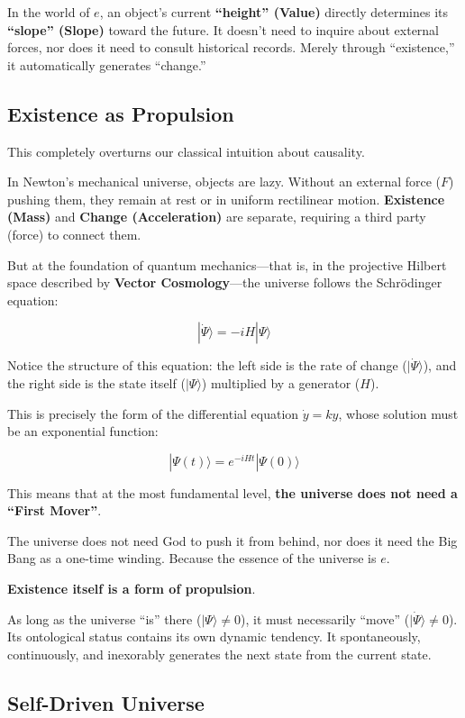 In the world of $e$, an object's current \textbf{``height'' (Value)} directly determines its \textbf{``slope'' (Slope)} toward the future. It doesn't need to inquire about external forces, nor does it need to consult historical records. Merely through ``existence,'' it automatically generates ``change.''

\subsection{Existence as Propulsion}

This completely overturns our classical intuition about causality.

In Newton's mechanical universe, objects are lazy. Without an external force ($F$) pushing them, they remain at rest or in uniform rectilinear motion. \textbf{Existence (Mass)} and \textbf{Change (Acceleration)} are separate, requiring a third party (force) to connect them.

But at the foundation of quantum mechanics---that is, in the projective Hilbert space described by \textbf{Vector Cosmology}---the universe follows the Schrödinger equation:

$$|\dot{\Psi}\rangle = -iH |\Psi\rangle$$

Notice the structure of this equation: the left side is the rate of change ($|\dot{\Psi}\rangle$), and the right side is the state itself ($|\Psi\rangle$) multiplied by a generator ($H$).

This is precisely the form of the differential equation $\dot{y} = ky$, whose solution must be an exponential function:

$$|\Psi(t)\rangle = e^{-iHt} |\Psi(0)\rangle$$

This means that at the most fundamental level, \textbf{the universe does not need a ``First Mover''}.

The universe does not need God to push it from behind, nor does it need the Big Bang as a one-time winding. Because the essence of the universe is \textbf{$e$}.

\textbf{Existence itself is a form of propulsion}.

As long as the universe ``is'' there ($|\Psi\rangle \neq 0$), it must necessarily ``move'' ($|\dot{\Psi}\rangle \neq 0$). Its ontological status contains its own dynamic tendency. It spontaneously, continuously, and inexorably generates the next state from the current state.

\subsection{Self-Driven Universe}

